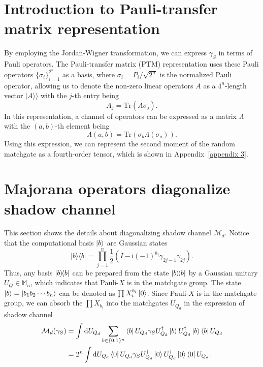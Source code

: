 \documentclass[showpacs,twocolumn,aps,prx,long bibliography,superscriptaddress,notitlepage]{revtex4-1}
\newcommand{\ii}{\mathsf{i}}
\newcommand{\supket}[1]{|#1 \rangle\rangle}
\newcommand{\cbra}[1]{\{ #1 \}}
\newcommand{\Mbb}{\mathbb{M}}
\begin{document}
\appendix

\section{Introduction to Pauli-transfer matrix representation}
\label{appendix: intro_superoperator}

By employing the Jordan-Wigner transformation, we can express $\gamma_S$ in terms of Pauli operators. The Pauli-transfer matrix (PTM) representation uses these Pauli operators $\cbra{\sigma_i}_{i=1}^{2^n}$ as a basis, where $\sigma_i =P_i/\sqrt{2^n}$ is the normalized Pauli operator, allowing us to denote the non-zero linear operators $A$ as a $4^n$-length vector $\supket{A}$ with the $j$-th entry being
\begin{equation}
A_j = \text{Tr}(A \sigma_j).
\end{equation}
In this representation, a channel of operators can be expressed as a matrix $\Lambda$ with the $(a,b)$-th element being
\begin{equation}
\Lambda(a,b) = \text{Tr}(\sigma_b \Lambda(\sigma_a)).
\end{equation}
Using this expression, we can represent the second moment of the random matchgate as a fourth-order tensor, which is shown in Appendix~\ref{appendix 3}.



\section{Majorana operators diagonalize shadow channel}
\label{appendix: 1}


This section shows the details about diagonalizing shadow channel $\mathcal{M}_d$. 
Notice that the computational basis $\ket{b}$ are Gaussian states
\begin{equation}
    |b\rangle\langle b|=\prod_{j=1}^n \frac{1}{2}\left(I-\ii(-1)^{b_j} \gamma_{2 j-1} \gamma_{2 j}\right).
\end{equation}
Thus, any basis $\ketbra{b}{b}$ can be prepared from the state $\ketbra{b}{b}$ by a Gaussian unitary $U_Q\in \Mbb_n$, which indicates that Pauli-$X$ is in the matchgate group. 
The state $\ket{b}= \ket{b_1b_2\cdots b_n}$ can be denoted as $\prod X_{i}^{b_i} \ket{0}$. 
Since Pauli-$X$ is in the matchgate group, we can absorb the $\prod X_{b_i}$ into the matchgates $U_{Q_d}$ in the expression of shadow channel
\begin{align}
\mathcal{M}_d(\gamma_S) &= \int \dd U_{Q_d}\sum_{b\in\{0,1\}^n}\bra{b}U_{Q_d}\gamma_S U_{Q_d}^\dagger \ket{b} U_{Q_d}^\dagger \ket{b}\bra{b}U_{Q_d}\\
&= 2^n\int \dd U_{Q_d} \bra{0}U_{Q_d}\gamma_S U_{Q_d}^\dagger \ket{0} U_{Q_d}^\dagger \ket{0}\bra{0}U_{Q_d}.
\end{align}
\end{document}
